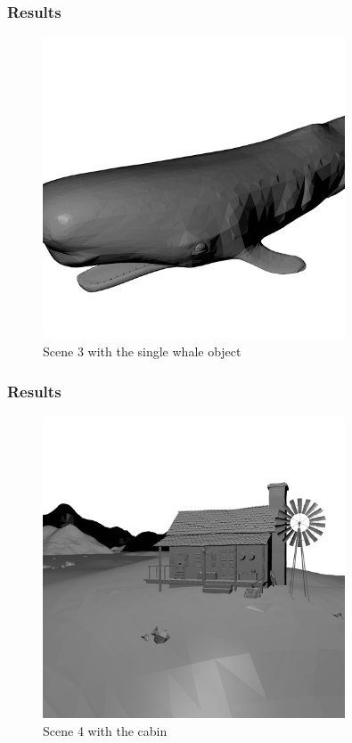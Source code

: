 \documentclass{beamer}
\newenvironment{figure*}%
{\begin{figure}}
{\end{figure}}
\begin{document}
\begin{frame}
  \frametitle{Results}
\begin{figure}
\centering
\includegraphics[width=0.8\textwidth]{whale.png}
\caption{Scene 3 with the single whale object}
\end{figure}
\end{frame}


\begin{frame}
  \frametitle{Results}
\begin{figure}
\centering
\includegraphics[width=0.8\textwidth]{cabin.png}
\caption{Scene 4 with the cabin}
\end{figure}
\end{frame}
\end{document}
